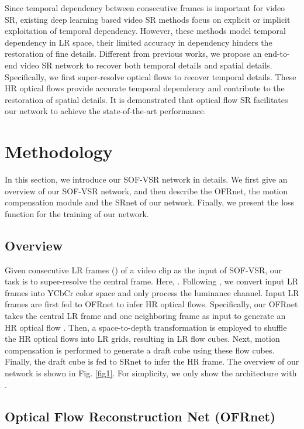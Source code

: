 \documentclass[journal]{IEEEtran}
\begin{document}
	Since temporal dependency between consecutive frames is important for video SR, existing deep learning based video SR methods focus on explicit or implicit exploitation of temporal dependency. However, these methods model temporal dependency in LR space, their limited accuracy in dependency hinders the restoration of fine details. Different from previous works, we propose an end-to-end video SR network to recover both temporal details and spatial details. Specifically, we first super-resolve optical flows to recover temporal details. These HR optical flows provide accurate temporal dependency and contribute to the restoration of spatial details. It is demonstrated that optical flow SR facilitates our network to achieve the state-of-the-art performance.
	
	\section{Methodology}
	In this section, we introduce our SOF-VSR network in details. We first give an overview of our SOF-VSR network, and then describe the OFRnet, the motion compensation module and the SRnet of our network. Finally, we present the loss function for the training of our network.
	
	\subsection{Overview}
	Given  consecutive LR frames () of a video clip as the input of SOF-VSR, our task is to super-resolve the central frame. Here, . Following \cite{2017-RobustVideoSuperResolutionwithLearnedTemporalDynamics-Liu--}, we convert input LR frames into YCbCr color space and only process the luminance channel. Input LR frames are first fed to OFRnet to infer HR optical flows. Specifically, our OFRnet takes  the central LR frame  and one neighboring frame  as input to generate an HR optical flow . Then, a space-to-depth
	transformation \cite{2018-FrameRecurrentVideoSuperResolution-Sajjadi-6626-6634}
	is employed to shuffle the HR optical flows into LR grids, resulting in LR flow cubes. Next, motion compensation is performed to generate a draft cube using these flow cubes. Finally, the draft cube is fed to SRnet to infer the HR frame. The overview of
	our network is shown in Fig. \ref{fig1}. For simplicity, we only show the architecture with .
	
	\subsection{Optical Flow Reconstruction Net (OFRnet)}
	
\end{document}
